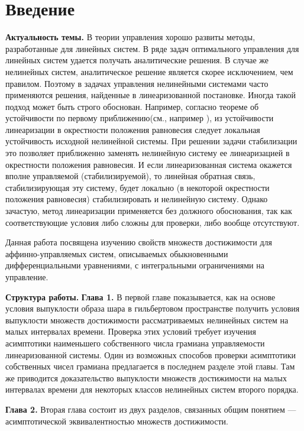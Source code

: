 \documentclass[../main.tex]{subfiles}
\begin{document}
\clearpage
\section*{Введение}
\textbf{Актуальность темы.} В теории управления хорошо развиты методы, разработанные для линейных систем. 
В ряде задач оптимального управления для линейных систем удается получать аналитические решения. 
В случае же нелинейных систем, аналитическое решение является скорее исключением, чем правилом. 
Поэтому в задачах управления нелинейными системами часто применяются решения, найденные в линеаризованной постановке. 
Иногда такой подход может быть строго обоснован. 
Например, согласно теореме об устойчивости по первому приближению(см., например \cite{Barbashin_book}), из устойчивости линеаризации в окрестности положения равновесия следует локальная устойчивость исходной нелинейной системы. 
При решении задачи стабилизации это позволяет приближенно заменять нелинейную систему ее линеаризацией в окрестности положения равновесия. 
И если линеаризованная система окажется вполне управляемой (стабилизируемой), то линейная обратная связь, стабилизирующая эту систему, будет локально (в некоторой окрестности положения равновесия) стабилизировать и нелинейную систему\cite{Kras_add, Stab_lectures, Khalil, Polyak_book}.  Однако зачастую, метод линеаризации применяется без должного обоснования, так как соответствующие условия либо сложны для проверки, либо вообще отсутствуют.

Данная работа посвящена изучению свойств множеств достижимости для аффинно-управляемых систем, описываемых обыкновенными дифференциальными уравнениями, с интегральными ограничениями на управление. 

\textbf{Структура работы.}  \textbf{Глава 1. }В первой главе показывается, как на основе условия выпуклости образа шара в гильбертовом пространстве получить условия выпуклости множеств достижимости рассматриваемых нелинейных систем на малых интервалах времени. Проверка этих условий требует изучения асимптотики наименьшего собственного числа грамиана управляемости линеаризованной системы. Один из возможных способов проверки асимптотики собственных чисел грамиана предлагается в последнем разделе этой главы. Там же приводится доказательство выпуклости множеств достижимости на малых интервалах времени для некоторых классов нелинейных систем второго порядка. 

\textbf{Глава 2. }
Вторая глава состоит из двух разделов, связанных общим понятием --- асимптотической эквивалентностью множеств достижимости. 
\end{document}
